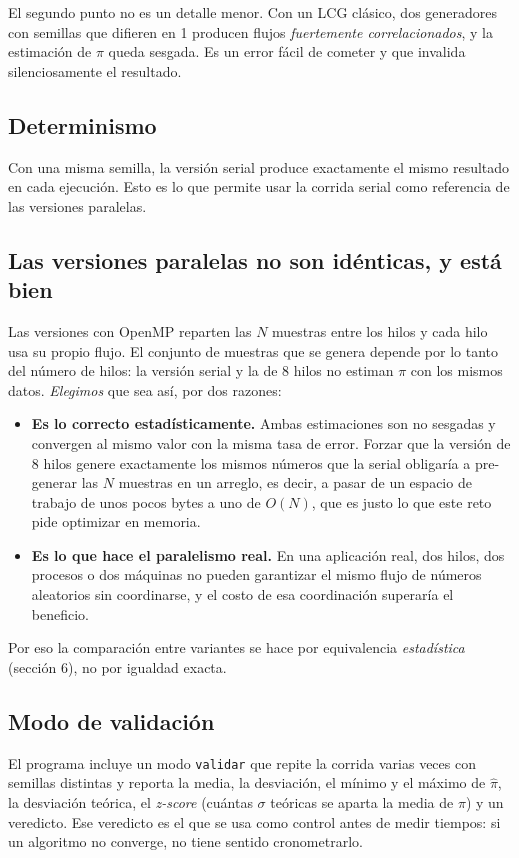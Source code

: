 El segundo punto no es un detalle menor. Con un LCG clásico, dos generadores con semillas que difieren en 1 producen flujos \emph{fuertemente correlacionados}, y la estimación de $\pi$ queda sesgada. Es un error fácil de cometer y que invalida silenciosamente el resultado.

\subsection{Determinismo}

Con una misma semilla, la versión serial produce exactamente el mismo resultado en cada ejecución. Esto es lo que permite usar la corrida serial como referencia de las versiones paralelas.

\subsection{Las versiones paralelas no son idénticas, y está bien}

Las versiones con OpenMP reparten las $N$ muestras entre los hilos y cada hilo usa su propio flujo. El conjunto de muestras que se genera depende por lo tanto del número de hilos: la versión serial y la de 8 hilos no estiman $\pi$ con los mismos datos. \emph{Elegimos} que sea así, por dos razones:

\begin{itemize}
    \item \textbf{Es lo correcto estadísticamente.} Ambas estimaciones son no sesgadas y convergen al mismo valor con la misma tasa de error. Forzar que la versión de 8 hilos genere exactamente los mismos números que la serial obligaría a pre-generar las $N$ muestras en un arreglo, es decir, a pasar de un espacio de trabajo de unos pocos bytes a uno de $O(N)$, que es justo lo que este reto pide optimizar en memoria.
    \item \textbf{Es lo que hace el paralelismo real.} En una aplicación real, dos hilos, dos procesos o dos máquinas no pueden garantizar el mismo flujo de números aleatorios sin coordinarse, y el costo de esa coordinación superaría el beneficio.
\end{itemize}

Por eso la comparación entre variantes se hace por equivalencia \emph{estadística} (sección 6), no por igualdad exacta.

\subsection{Modo de validación}

El programa incluye un modo \texttt{validar} que repite la corrida varias veces con semillas distintas y reporta la media, la desviación, el mínimo y el máximo de $\hat\pi$, la desviación teórica, el \emph{z-score} (cuántas $\sigma$ teóricas se aparta la media de $\pi$) y un veredicto. Ese veredicto es el que se usa como control antes de medir tiempos: si un algoritmo no converge, no tiene sentido cronometrarlo.
